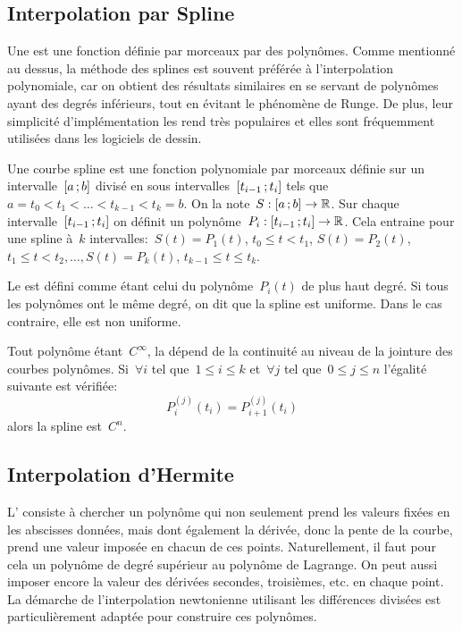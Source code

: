 \subsection{Interpolation par Spline} 
Une  est une fonction définie par morceaux par des polynômes. Comme mentionné au dessus, la méthode des splines est souvent préférée à l'interpolation polynomiale, car on obtient des résultats similaires en se servant de polynômes ayant des degrés inférieurs, tout en évitant le phénomène de Runge. De plus, leur simplicité d'implémentation les rend très populaires et elles sont fréquemment utilisées dans les logiciels de dessin. 

Une courbe spline est une fonction polynomiale par morceaux définie sur un intervalle~$\mathopen{[}a\,;b\mathclose{]}$ divisé en sous intervalles~$\mathopen{[}t_{i-1}\,;t_i\mathclose{]}$ tels que~$a = t_0 < t_1 < \ldots < t_{k-1} < t_k = b$. On la note~$S: \mathopen{[}a\,;b\mathclose{]}\to \mathbb R$. Sur chaque intervalle~$\mathopen{[}t_{i-1}\,;t_i\mathclose{]}$ on définit un polynôme~$ P_i: \mathopen{[}t_{i-1}\,;t_i\mathclose{]} \to \mathbb R$. Cela entraine pour une spline à~$k$ intervalles:~$S(t) = P_1 (t)$, $t_0 \le t < t_1$, $S(t) = P_2 (t)$, $t_1 \le t < t_2,\ldots,S(t) = P_k (t)$, $t_{k-1} \le t \le t_k$. 

Le  est défini comme étant celui du polynôme~$P_i (t)$ de plus haut degré. Si tous les polynômes ont le même degré, on dit que la spline est uniforme. Dans le cas contraire, elle est non uniforme. 

Tout polynôme étant~$C^\infty$, la  dépend de la continuité au niveau de la jointure des courbes polynômes. Si~$\forall i$ tel que~$1 \le i \le k$ et~$\forall j$ tel que~$0 \le j \le n$ l'égalité suivante est vérifiée: 
\begin{equation}
 P_i^{(j)} (t_i) = P_{i+1}^{(j)} (t_i)
\end{equation}
alors la spline est~$C^n$. 
 
\subsection{Interpolation d'Hermite}
L' consiste à chercher un polynôme qui non seulement prend les valeurs fixées en les abscisses données, mais dont également la dérivée, donc la pente de la courbe, prend une valeur imposée en chacun de ces points. Naturellement, il faut pour cela un polynôme de degré supérieur au polynôme de Lagrange.  On peut aussi imposer encore la valeur des dérivées secondes, troisièmes, etc. en chaque point. La démarche de l'interpolation newtonienne utilisant les différences divisées est particulièrement adaptée pour construire ces polynômes. 
 
